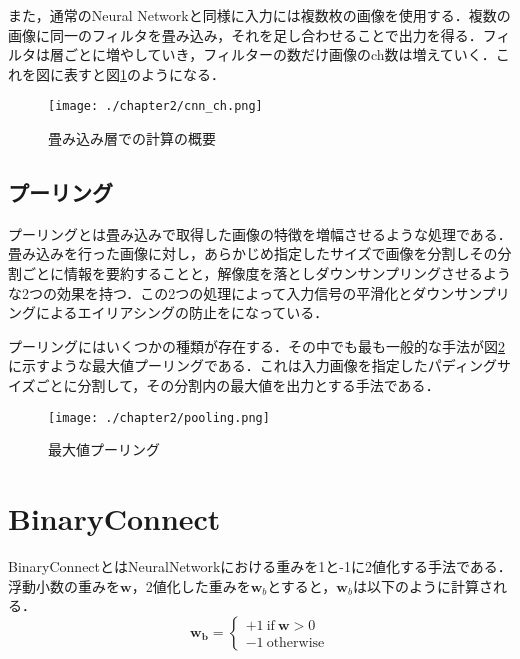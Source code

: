 また，通常のNeural Networkと同様に入力には複数枚の画像を使用する．複数の画像に同一のフィルタを畳み込み，それを足し合わせることで出力を得る．フィルタは層ごとに増やしていき，フィルターの数だけ画像のch数は増えていく．これを図に表すと図\ref{fig_cnn_ch}のようになる．
\begin{figure}[htbp]
  \begin{center}
    \texttt{[image: ./chapter2/cnn\_ch.png]}
    \caption{畳み込み層での計算の概要}
    \label{fig_cnn_ch}
  \end{center}
\end{figure}

\subsection{プーリング}
プーリングとは畳み込みで取得した画像の特徴を増幅させるような処理である．畳み込みを行った画像に対し，あらかじめ指定したサイズで画像を分割しその分割ごとに情報を要約することと，解像度を落としダウンサンプリングさせるような2つの効果を持つ．この2つの処理によって入力信号の平滑化とダウンサンプリングによるエイリアシングの防止をになっている．

プーリングにはいくつかの種類が存在する．その中でも最も一般的な手法が図\ref{fig_pooling}に示すような最大値プーリングである．これは入力画像を指定したパディングサイズごとに分割して，その分割内の最大値を出力とする手法である\cite{book_tex}．
\begin{figure}[htbp]
  \begin{center}
    \texttt{[image: ./chapter2/pooling.png]}
    \caption{最大値プーリング}
    \label{fig_pooling}
  \end{center}
\end{figure}


\section{BinaryConnect}
BinaryConnectとはNeuralNetworkにおける重みを1と-1に2値化する手法である．浮動小数の重みを$\bm{w}$，2値化した重みを$\bm{w}_b$とすると，$\bm{w}_b$は以下のように計算される．
\begin{displaymath}
  \bm{w_{b}} = \left\{ \begin{array}{l}
  \displaystyle 
  +1\:  \text{if}\:  \bm{w} > 0 \\
  -1\:\text{otherwise}
  \end{array} \right.
\end{displaymath}

